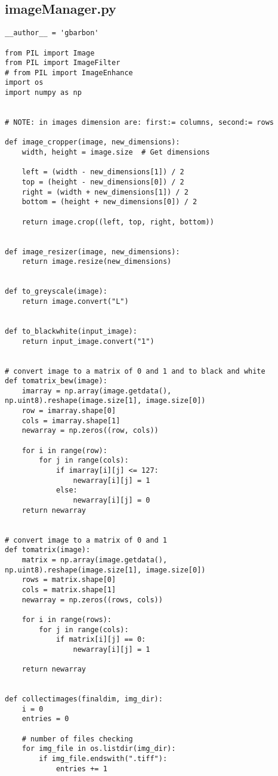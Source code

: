 \documentclass[letterpaper,twocolumn,10pt]{article}
\begin{document}
\clearpage
\subsection{imageManager.py}
\begin{lstlisting}
__author__ = 'gbarbon'

from PIL import Image
from PIL import ImageFilter
# from PIL import ImageEnhance
import os
import numpy as np


# NOTE: in images dimension are: first:= columns, second:= rows

def image_cropper(image, new_dimensions):
    width, height = image.size  # Get dimensions

    left = (width - new_dimensions[1]) / 2
    top = (height - new_dimensions[0]) / 2
    right = (width + new_dimensions[1]) / 2
    bottom = (height + new_dimensions[0]) / 2

    return image.crop((left, top, right, bottom))


def image_resizer(image, new_dimensions):
    return image.resize(new_dimensions)


def to_greyscale(image):
    return image.convert("L")


def to_blackwhite(input_image):
    return input_image.convert("1")


# convert image to a matrix of 0 and 1 and to black and white
def tomatrix_bew(image):
    imarray = np.array(image.getdata(), np.uint8).reshape(image.size[1], image.size[0])
    row = imarray.shape[0]
    cols = imarray.shape[1]
    newarray = np.zeros((row, cols))

    for i in range(row):
        for j in range(cols):
            if imarray[i][j] <= 127:
                newarray[i][j] = 1
            else:
                newarray[i][j] = 0
    return newarray


# convert image to a matrix of 0 and 1
def tomatrix(image):
    matrix = np.array(image.getdata(), np.uint8).reshape(image.size[1], image.size[0])
    rows = matrix.shape[0]
    cols = matrix.shape[1]
    newarray = np.zeros((rows, cols))

    for i in range(rows):
        for j in range(cols):
            if matrix[i][j] == 0:
                newarray[i][j] = 1

    return newarray


def collectimages(finaldim, img_dir):
    i = 0
    entries = 0

    # number of files checking
    for img_file in os.listdir(img_dir):
        if img_file.endswith(".tiff"):
            entries += 1


\end{lstlisting}
\end{document}

